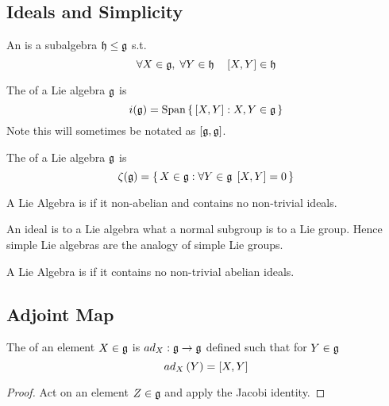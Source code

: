 \documentclass{article}
\begin{document}
\subsection{Ideals and Simplicity}

\begin{definition}[ideal]
An  is a subalgebra $\mf{h} \leq \mf{g}$ s.t.
\[
\forall X\in\mf{g}, \; \forall Y\in\mf{h} \quad  \comm[X]{Y}\in\mf{h}
\]
\end{definition}

\begin{definition}
The  of a Lie algebra $\mf{g}$ is 
\[
i(\mf{g})=\spn\set{\comm[X]{Y} : X,Y\in\mf{g}}
\]
Note this will sometimes be notated as $\comm[\mf{g}]{\mf{g}}$. 
\end{definition}

\begin{definition}[Centre]
The  of a Lie algebra $\mf{g}$ is 
\[
\zeta(\mf{g})=\set{X\in\mf{g} : \forall Y\in\mf{g} \; \comm[X]{Y}=0}
\]
\end{definition}

\begin{definition}
A Lie Algebra is  if it non-abelian and contains no non-trivial ideals.
\end{definition}

\begin{idea}
An ideal is to a Lie algebra what a normal subgroup is to a Lie group. Hence simple Lie algebras are the analogy of simple Lie groups.  
\end{idea}

\begin{definition}
A Lie Algebra is  if it contains no non-trivial abelian ideals. 
\end{definition}

\subsection{Adjoint Map}

\begin{definition}
The  of an element $X\in\mf{g}$ is $ad_{X}:\mf{g}\to\mf{g}$ defined such that for $Y\in\mf{g}$
\[
ad_{X}\left(Y\right)=\comm[X]{Y}
\]
\end{definition}

\begin{lemma}
\end{lemma}
\begin{proof}
Act on an element $Z \in \mf{g}$ and apply the Jacobi identity.
\end{proof}
\end{document}
